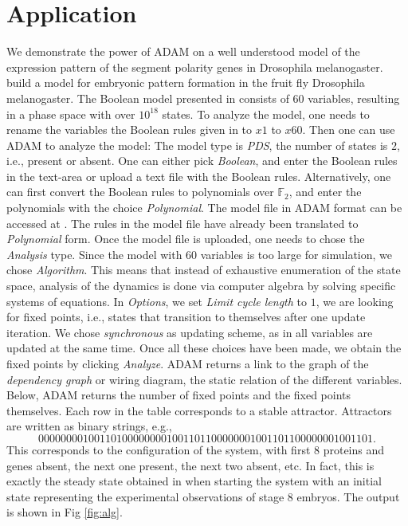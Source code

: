 \documentclass[11pt]{amsart}
\begin{document}
\section{Application} \label{benchmarks}
We demonstrate the power of ADAM on a well understood model of the expression
pattern of the segment polarity genes in Drosophila melanogaster. \cite{AO} build a model for embryonic pattern formation in the fruit fly Drosophila melanogaster. The Boolean
model presented in \cite{AO} consists of 60 variables, resulting in a phase
space with over $10^{18}$ states. To analyze the model, one needs to rename the variables the Boolean rules given in \cite{AO} to $x1$ to $x60$. Then one can use ADAM to analyze the model: The model type is {\it PDS}, the number of states is $2$, i.e., present or absent. One can either pick {\it Boolean}, and enter the Boolean rules in the text-area or upload a text file with the Boolean rules. Alternatively, one can first convert the Boolean rules to polynomials over $\mathbb F_2$, and enter the polynomials with the choice {\it Polynomial}. The model file in ADAM format can be accessed at \cite{DrosophilaModel}. The rules in the model file have already been translated to {\it Polynomial} form. Once the model file is uploaded, one needs to chose the {\it Analysis} type. Since the model with $60$ variables is too large for simulation, we chose {\it Algorithm}. This means that instead of exhaustive enumeration of the state space, analysis of the dynamics is done via computer algebra by solving specific systems of equations. In {\it Options}, we set {\it Limit cycle length} to $1$, we are looking for fixed points, i.e., states that transition to themselves after one update iteration. We chose {\it synchronous} as updating scheme, as in \cite{AO} all variables are updated at the same time. Once all these choices have been made, we obtain the fixed points by clicking {\it Analyze}.
ADAM returns a link to the graph of the {\it dependency graph} or wiring diagram, the static relation of the different variables. Below, ADAM returns the number of fixed points and the fixed points themselves. Each row in the table corresponds to a stable attractor. Attractors are written as binary strings, e.g., $$000000001001101000000001001101100000001001101100000001001101.$$
This corresponds to the configuration of the system, with first 8 proteins and genes absent, the next one present, the next two absent, etc. In fact, this is exactly the steady state obtained in \cite[Figure 4(b)]{AO} when starting the system with an initial state representing the experimental observations of stage 8 embryos. The output is shown in Fig \ref{fig:alg}.
 
\end{document}
